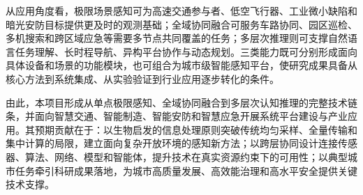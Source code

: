 从应用角度看，极限场景感知可为高速交通参与者、低空飞行器、工业微小缺陷和暗光安防目标提供更及时的观测基础；全域协同融合可服务车路协同、园区巡检、多机搜索和跨区域应急等需要多节点共同覆盖的任务；多层次推理则可支撑自然语言任务理解、长时程导航、异构平台协作与动态规划。三类能力既可分别形成面向具体设备和场景的功能模块，也可组合为城市级智能感知平台，使研究成果具备从核心方法到系统集成、从实验验证到行业应用逐步转化的条件。

由此，本项目形成从单点极限感知、全域协同融合到多层次认知推理的完整技术链条，并面向智慧交通、智能制造、智能安防和智慧应急开展系统平台建设与产业应用。其预期贡献在于：以生物启发的信息处理原则突破传统均匀采样、全量传输和集中计算的局限，建立面向复杂开放环境的感知新方法；以跨层协同设计连接传感器、算法、网络、模型和智能体，提升技术在真实资源约束下的可用性；以典型城市任务牵引科研成果落地，为城市高质量发展、高效能治理和高水平安全提供关键技术支撑。

\clearpage
